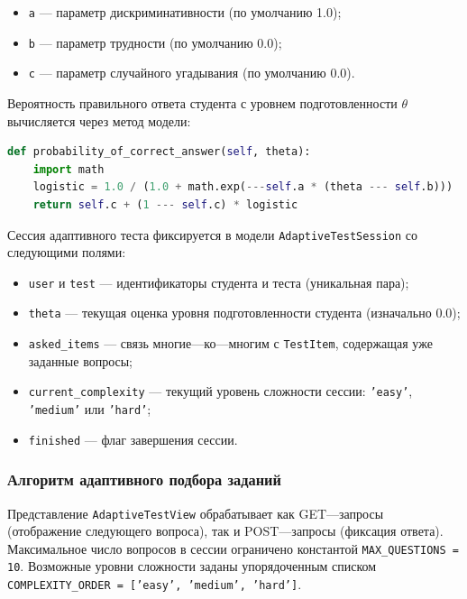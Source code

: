 \begin{itemize}
    \item \texttt{a} --- параметр дискриминативности (по умолчанию 1.0);
    \item \texttt{b} --- параметр трудности (по умолчанию 0.0);
    \item \texttt{c} --- параметр случайного угадывания (по умолчанию 0.0).
\end{itemize}

Вероятность правильного ответа студента с уровнем подготовленности 
$\theta$ вычисляется через метод модели:

\begin{lstlisting}[language=Python, 
    caption={Вычисление вероятности правильного ответа (IRT)},
    basicstyle=\small\ttfamily]
def probability_of_correct_answer(self, theta):
    import math
    logistic = 1.0 / (1.0 + math.exp(---self.a * (theta --- self.b)))
    return self.c + (1 --- self.c) * logistic
\end{lstlisting}

Сессия адаптивного теста фиксируется в модели 
\texttt{AdaptiveTestSession} со следующими полями:
\begin{itemize}
    \item \texttt{user} и \texttt{test} --- идентификаторы студента 
          и теста (уникальная пара);
    \item \texttt{theta} --- текущая оценка уровня подготовленности 
          студента (изначально 0.0);
    \item \texttt{asked\_items} --- связь многие---ко---многим с 
          \texttt{TestItem}, содержащая уже заданные вопросы;
    \item \texttt{current\_complexity} --- текущий уровень сложности 
          сессии: \texttt{'easy'}, \texttt{'medium'} или \texttt{'hard'};
    \item \texttt{finished} --- флаг завершения сессии.
\end{itemize}

\subsubsection{Алгоритм адаптивного подбора заданий}

Представление \texttt{AdaptiveTestView} обрабатывает как GET---запросы 
(отображение следующего вопроса), так и POST---запросы (фиксация ответа). 
Максимальное число вопросов в сессии ограничено константой 
\texttt{MAX\_QUESTIONS = 10}. Возможные уровни сложности заданы 
упорядоченным списком \texttt{COMPLEXITY\_ORDER = ['easy', 'medium', 'hard']}.


